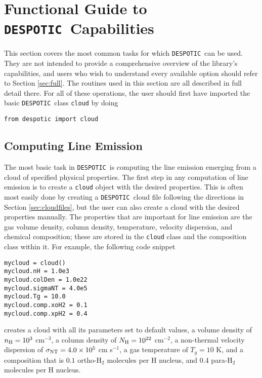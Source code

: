 \documentclass[12pt]{article}
\newcommand{\despotic}{\texttt{DESPOTIC}}
\begin{document}
\clearpage

\section{Functional Guide to \despotic\ Capabilities}

This section covers the most common tasks for which \despotic\ can be used. They are not intended to provide a comprehensive overview of the library's capabilities, and users who wish to understand every available option should refer to Section \ref{sec:full}. The routines used in this section are all described in full detail there. For all of these operations, the user should first have imported the basic \despotic\ class \verb=cloud= by doing
\begin{verbatim}
from despotic import cloud
\end{verbatim}


\subsection{Computing Line Emission}

The most basic task in \despotic\ is computing the line emission emerging from a cloud of specified physical properties. The first step in any computation of line emission is to create a \verb=cloud= object with the desired properties. This is often most easily done by creating a \despotic\ cloud file following the directions in Section \ref{sec:cloudfiles}, but the user can also create a cloud with the desired properties manually. The properties that are important for line emission are the gas volume density, column density, temperature, velocity dispersion, and chemical composition; these are stored in the \verb=cloud= class and the composition class within it. For example, the following code snippet
\begin{verbatim}
mycloud = cloud()
mycloud.nH = 1.0e3
mycloud.colDen = 1.0e22
mycloud.sigmaNT = 4.0e5
mycloud.Tg = 10.0
mycloud.comp.xoH2 = 0.1
mycloud.comp.xpH2 = 0.4
\end{verbatim}
creates a cloud with all its parameters set to default values, a volume density of $n_{\rm H} = 10^3$ cm$^{-3}$, a column density of $N_{\rm H} = 10^{22}$ cm$^{-2}$, a non-thermal velocity dispersion of $\sigma_{\rm NT} = 4.0\times 10^5$ cm s$^{-1}$, a gas temperature of $T_g = 10$ K, and a composition that is $0.1$ ortho-H$_2$ molecules per H nucleus, and 0.4 para-H$_2$ molecules per H nucleus.
\end{document}
